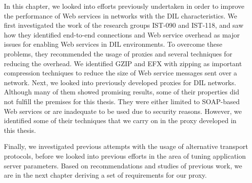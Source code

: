 In this chapter, we looked into efforts previously undertaken in order to
improve the performance of Web services in networks with the DIL
characteristics. We first investigated the work of the research groups IST-090
and IST-118, and saw how they identified end-to-end connections and Web service
overhead as major issues for enabling Web services in DIL environments. To
overcome these problems, they recommended the usage of proxies and several
techniques for reducing the overhead. We identified GZIP and EFX with zipping as
important compression techniques to reduce the size of Web service messages sent
over a network. Next, we looked into previously developed proxies for DIL
networks. Although many of them showed promising results, some of their
properties did not fulfill the premises for this thesis. They were either
limited to SOAP-based Web services or are inadequate to be used due to security
reasons. However, we identified some of their techniques that we carry on in the
proxy developed in this thesis.

Finally, we investigated previous attempts with the usage of alternative
transport protocols, before we looked into previous efforts in the area of
tuning application server parameters. Based on recommendations and studies of
previous work, we are in the next chapter deriving a set of requirements for our
proxy.
